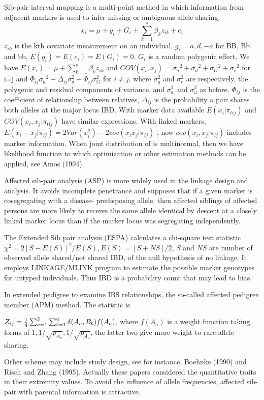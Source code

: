 Sib-pair interval mapping is a multi-point method in which information from
adjacent markers is used to infer missing or ambiguous allele sharing.
  $$x_i=\mu+g_i+G_i+\sum^s_{k=1}\beta_k z_{ik}+e_i$$
$z_{ik}$ is the kth covariate measurement on an individual. $g_i=a,d,-a$
for BB, Bb and bb, $E(g_i)=E(e_i)=E(G_i)=0$. $G_i$ is a random
polygenic effect. We have $E(x_i)=\mu+\sum^s_{k=1}\beta_k z_{ik}$ and
$COV(x_i,x_j)={\sigma_a}^2+{\sigma_d}^2+{\sigma_G}^2+{\sigma_e}^2$ for i=j and
$\Phi_{ij}{\sigma_a}^2+\Delta_{ij}\sigma^2_d+\Phi_{ij}\sigma^2_G$ for $i\ne j$,
where $\sigma^2_g$
and $\sigma^2_e$ are respectively, the polygenic and residual components of
variance.  and $\sigma^2_a$ and $\sigma^2_d$ as before.
$\Phi_{ij}$ is the coefficient of relationship between relatives, $\Delta_{ij}$
is the probability a pair shares both alleles at the major locus IBD.
With marker data available $E(x_i|\pi_{tij})$ and $COV(x_i,x_j|\pi_{tij})$ have
similar expressions. With linked markers,
$E(x_i-x_j|\pi_{ij})=2Var(x^2_i)-2cov(x_i x_j|\pi_{ij})$ , now
$cov(x_i,x_j|\pi_{ij})$
includes marker information. When joint distribution of  is multinormal,
then we have likelihood function to which optimization or other
estimation methods can be applied, see Amos (1994).

Affected sib-pair analysis (ASP) is more widely used in the linkage design and
analysis.  It avoids incomplete penetrance and supposes that if a given marker
is cosegregating with a disease- predisposing allele, then affected siblings of
affected persons are more likely to receive the same allele identical by
descent at a closely linked marker locus than if the marker locus was
segregating independently.

The Extended Sib pair analysis (ESPA) calculates a chi-square test statistic
$\chi^2=2{[S-E(S)]}^2/E(S), E(S)=[S+NS]/2$, $S$ and $NS$ are number of observed
allele shared/not shared IBD, of the null hypothesis of no linkage.  It employs
LINKAGE/MLINK program to estimate the possible marker genotypes for untyped
individuals.  Thus IBD is a probability count that may lead to bias.

In extended pedigree to examine IBS relationships, the so-called affected
pedigree member (APM) method.  The statistic is

$Z_{ij}={1\over4}\sum^2_{a=1}\sum^a_{b=1}\delta(A_a,B_b)f(A_a)$, where $f(A_a)$
is a weight function taking forms of $1,1/\sqrt{p_{A_a}}, 1/\sqrt{p_{A_a}}$,
the latter two give more weight to rare-allele sharing.

Other scheme may include study design, see for instance, Boehnke (1990) and
Risch and Zhang (1995).  Actually these papers considered the quantitative
traits in their extremity values.  To avoid the influence of allele
frequencies, affected sib-pair with parental information is attractive.

